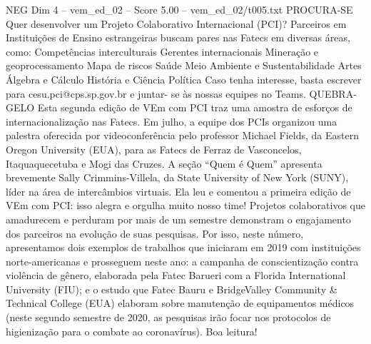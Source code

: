 \begin{textsample}{NEG Dim 4 – vem\_ed\_02 – Score 5.00 – vem\_ed\_02/t005.txt}  \label{ex:f4_neg_143}
PROCURA-SE Quer desenvolver um Projeto Colaborativo Internacional (PCI)?
Parceiros em Instituições de Ensino estrangeiras buscam pares nas Fatecs em diversas áreas, como: Competências interculturais Gerentes internacionais Mineração e geoprocessamento Mapa de riscos Saúde Meio Ambiente e Sustentabilidade Artes Álgebra e Cálculo História e Ciência Política Caso tenha interesse, basta escrever para cesu.pci@cps.sp.gov.br e juntar- se às nossas equipes no Teams.
QUEBRA-GELO Esta segunda edição de VEm com PCI traz uma amostra de esforços de internacionalização nas Fatecs.
Em julho, a equipe dos PCIs organizou uma palestra oferecida por videoconferência pelo professor Michael Fields, da Eastern Oregon University (EUA), para as Fatecs de Ferraz de Vasconcelos, Itaquaquecetuba e Mogi das Cruzes.
A seção “Quem é Quem” apresenta brevemente Sally Crimmins-Villela, da State University of New York (SUNY), líder na área de intercâmbios virtuais.
Ela leu e comentou a primeira edição de VEm com PCI: isso alegra e orgulha muito nosso time!
Projetos colaborativos que amadurecem e perduram por mais de um semestre demonstram o engajamento dos parceiros na evolução de suas pesquisas.
Por isso, neste número, apresentamos dois exemplos de trabalhos que iniciaram em 2019 com instituições norte-americanas e prosseguem neste ano: a campanha de conscientização contra violência de gênero, elaborada pela Fatec Barueri com a Florida International University (FIU); e o estudo que Fatec Bauru e BridgeValley Community \& Technical College (EUA) elaboram sobre manutenção de equipamentos médicos (neste segundo semestre de 2020, as pesquisas irão focar nos protocolos de higienização para o combate ao coronavírus).
Boa leitura!

\end{textsample}
